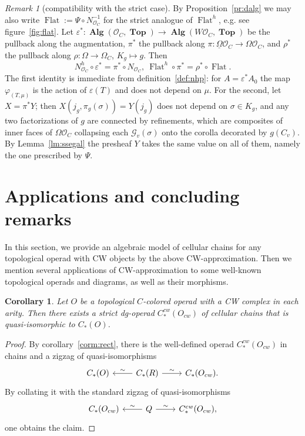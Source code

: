\documentclass{amsart}
\newtheorem{corollary}[formula]{Corollary}
\theoremstyle{definition}
\theoremstyle{remark}
\newtheorem{remark}[formula]{Remark}
\newcommand{\eps}{\varepsilon}
\DeclareMathOperator{\Top}{\mathbf{Top}}
\DeclareMathOperator{\Alg}{\mathbf{Alg}}
\DeclareMathOperator{\Flat}{Flat}
\begin{document}
	\begin{remark}[compatibility with the strict case]\label{rem:strict}
		By Proposition~\ref{pr:dalg} we may also write $\Flat:=\Psi\circ N_{\mathcal{O}_{C}}^{-1}$ for the
		strict analogue of $\Flat^h$, e.g. see figure~\ref{fig:flat}.
		Let $\eps^*\colon\Alg(\mathcal{O}_C,\Top)\to\Alg(W\mathcal{O}_C,\Top)$ be the pullback
		along the augmentation, $\pi^*$ the pullback along
		$\pi\colon\underline{\Omega}\mathcal{O}_C\to\Omega\mathcal{O}_C$, and $\rho^*$ the pullback along
		$\rho\colon\Omega\to\Omega_C$, $K_g\mapsto g$. 
		Then
		\[
		N^h_{\mathcal{O}_C}\circ\eps^*=\pi^*\circ N_{\mathcal{O}_C},\ 
		\Flat^h\circ\pi^*=
		\rho^*\circ\Flat.
		\]
		The first identity is immediate from definition~\ref{def:nhp}: for
		$A=\eps^*A_0$ the map $\varphi_{(T,\mu)}$ is the action of
		$\eps(T)$ and does not depend on $\mu$. 
		For the second, let $X=\pi^*Y$; then $X(j_g,\pi_g(\sigma))=Y(j_g)$ does not depend on $\sigma\in K_g$, and any two factorizations of $g$ are connected by
		refinements, which are composites of inner faces of $\Omega\mathcal{O}_C$
		collapsing each $\mathcal{G}_v(\sigma)$ onto the corolla decorated by $g(C_v)$.
		By Lemma~\ref{lm:ssegal} the presheaf $Y$ takes the same value on all of
		them, namely the one prescribed by $\Psi$. 
	\end{remark}
	
	\section{Applications and concluding remarks}\label{sec:app}
	
	In this section, we provide an algebraic model of cellular chains for any topological operad with CW objects by the above CW-approximation.
	Then we mention several applications of CW-approximation to some well-known topological operads and diagrams, as well as their morphisms.
	
	\begin{corollary}
		Let $O$ be a topological $C$-colored operad with a CW complex in each arity. 
		Then there exists a strict dg-operad $C_{*}^{cw}(O_{cw})$ of cellular chains that is quasi-isomorphic to $C_{*}(O)$.
	\end{corollary}
	\begin{proof}
		By corollary~\ref{corm:rect}, there is the well-defined operad $C_{*}^{cw}(O_{cw})$ in chains and a zigzag of quasi-isomorphisms
		\[
		\begin{tikzcd}
			C_{*}(O) & C_{*}(R)\arrow[swap]{l}{\sim}\arrow{r}{\sim} & C_{*}(O_{cw}).
		\end{tikzcd}
		\]
		By collating it with the standard zigzag of quasi-isomorphisms
		\[
		\begin{tikzcd}
			C_{*}(O_{cw}) & Q\arrow[swap]{l}{\sim}\arrow{r}{\sim} & C_{*}^{cw}(O_{cw}),
		\end{tikzcd}
		\]
		one obtains the claim.
	\end{proof}
	
\end{document}
